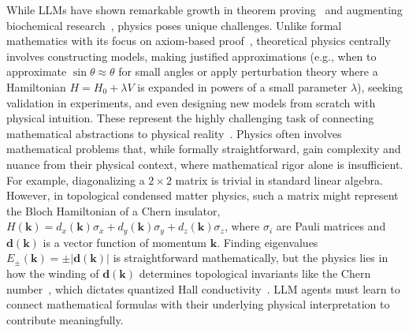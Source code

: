 While LLMs have shown remarkable growth in theorem proving~\cite{Azerbayev2023Llemma,Trinh2024Solving,Romera-Paredes2024Mathematical} and augmenting biochemical research~\cite{M.Bran2024Augmenting,Sarwal2025Benchmark}, physics poses unique challenges. Unlike formal mathematics with its focus on axiom-based proof~\cite{Azerbayev2023Llemma}, theoretical physics centrally involves constructing models, making justified approximations (e.g., when to approximate $\sin\theta \approx \theta$ for small angles or apply perturbation theory where a Hamiltonian $H = H_0 + \lambda V$ is expanded in powers of a small parameter $\lambda$), seeking validation in experiments, and even designing new models from scratch with physical intuition. These represent the highly challenging task of connecting mathematical abstractions to physical reality~\cite{Hagendorff2024Machine,Schaeffer2023Are,Wu2024Reasoning}. Physics often involves mathematical problems that, while formally straightforward, gain complexity and nuance from their physical context, where mathematical rigor alone is insufficient.
For example, diagonalizing a $2 \times 2$ matrix is trivial in standard linear algebra. However, in topological condensed matter physics, such a matrix might represent the Bloch Hamiltonian of a Chern insulator, $H(\mathbf{k}) = d_x(\mathbf{k})\sigma_x + d_y(\mathbf{k})\sigma_y + d_z(\mathbf{k})\sigma_z$, where $\sigma_i$ are Pauli matrices and $\mathbf{d}(\mathbf{k})$ is a vector function of momentum $\mathbf{k}$. Finding eigenvalues $E_\pm(\mathbf{k}) = \pm |\mathbf{d}(\mathbf{k})|$ is straightforward mathematically, but the physics lies in how the winding of $\mathbf{d}(\mathbf{k})$ determines topological invariants like the Chern number~\cite{Thouless1982Quantized}, which dictates quantized Hall conductivity~\cite{Klitzing1980New}. LLM agents must learn to connect mathematical formulas with their underlying physical interpretation to contribute meaningfully.

